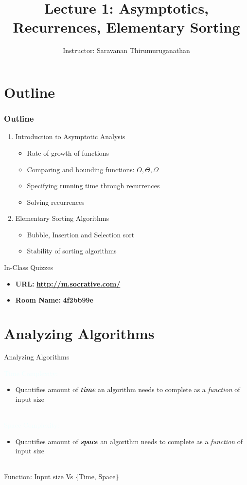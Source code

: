 \documentclass{beamer}
\title[Saravanan Thirumuruganathan] 
{Lecture 1: Asymptotics, Recurrences, Elementary Sorting}
\author[CSE 5311] 
{Instructor: Saravanan Thirumuruganathan}
\date[]
\newcommand{\tblue}[1]{{\Large {\textcolor{azure}{#1}}}}
\begin{document}
\begin{frame}
  \titlepage
\end{frame}


\section{Outline}

\begin{frame}
\frametitle {Outline}
\begin{enumerate}
\item Introduction to Asymptotic Analysis
\begin{itemize}
\item Rate of growth of functions
\item Comparing and bounding functions: $O, \Theta, \Omega$
\item Specifying running time through recurrences
\item Solving recurrences
\end{itemize}
\item Elementary Sorting Algorithms
\begin{itemize}
\item Bubble, Insertion and Selection sort
\item Stability of sorting algorithms
\end{itemize}
\end{enumerate}
\end{frame}

\begin{frame}{In-Class Quizzes}
\begin{itemize}
\item {\Large {\bf URL:}} {\LARGE \bf \url{http://m.socrative.com/}} 
\item {\Large {\bf Room Name:} {\LARGE \bf 4f2bb99e}}
\end{itemize}
\end{frame}

\section{Analyzing Algorithms}
\begin{frame}{Analyzing Algorithms}

\tblue{Time Complexity:}
\begin{itemize}
\item Quantifies amount of \textbf{\textit{time}} an algorithm needs to complete as a {\em function} of input size
\end{itemize}
~\\
\tblue{Space Complexity:}
\begin{itemize}
\item Quantifies amount of \textbf{\textit{space}} an algorithm needs to complete as a {\em function} of input size
\end{itemize}
~\\
Function: Input size Vs \{Time, Space\}
\end{frame}
\end{document}
